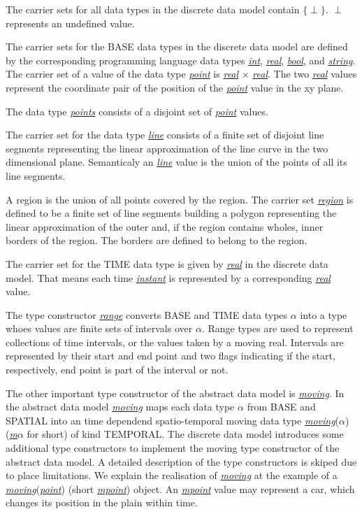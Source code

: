 \documentclass[a4paper]{article}
\newcommand{\dt}[1]{\textsl{\underline{#1}}}
\begin{document}
The carrier sets for all data types in the discrete data model contain
$\{\perp\}$. $\perp$ represents an undefined value. 

The carrier sets for the BASE data types in the discrete data model are defined
by the corresponding programming language data types \dt{int}, \dt{real}, \dt{bool},
and \dt{string}. The carrier set of a value of the data type \dt{point} is
\dt{real} $\times$ \dt{real}. The two \dt{real} values represent the
coordinate pair of the position of the \dt{point} value in the xy plane. 

The data type \dt{points} consists of a disjoint set of \dt{point} values. 

The carrier set for the data type \dt{line}
consists of a finite set of disjoint line segments representing the linear
approximation of the line curve in the two dimensional plane. Semanticaly an
\dt{line} value is the union of the points of all its line segments. 

A region
is the union of all points covered by the region. The carrier set \dt{region}
is defined to be a finite set of line segments building a polygon representing
the linear approximation of the outer and, if the region contains wholes, inner
borders of the region. The borders are defined to belong to the region.

The carrier set for the TIME data type is given by \dt{real} in the discrete
data model.
That means each time \dt{instant} is represented by a corresponding \dt{real}
value.

The type constructor \dt{range} converts BASE and TIME data types $\alpha$ into
a type whoes values are finite sets of intervals over $\alpha$. Range types are
used to represent collections of time intervals, or the values taken by a moving
real. Intervals are represented by their start and end point and two flags
indicating if the start, respectively, end point is part of the interval or not.

The other important type constructor of the abstract data model is \dt{moving}.
In the abstract data model \dt{moving} maps each data type $\alpha$ from BASE
and
SPATIAL into an time dependend spatio-temporal moving data type
\dt{moving}($\alpha$)
(\dt{m$\alpha$} for short) of kind TEMPORAL. The discrete data model introduces some
additional type constructors to implement the moving type constructor of the
abstract data model. A detailed description of the type constructors is skiped
due to place limitations. We explain the realisation of \dt{moving} at the example
of a \dt{moving}(\dt{point}) (short \dt{mpoint}) object. An \dt{mpoint} value
may represent a car, which changes its position in the plain within time.
\end{document}
